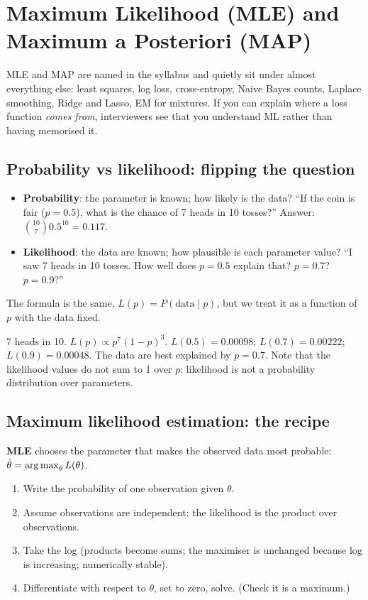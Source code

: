 \chapter{Maximum Likelihood (MLE) and Maximum a Posteriori (MAP)}

MLE and MAP are named in the syllabus and quietly sit under almost everything else: least squares, log loss, cross-entropy,
Naive Bayes counts, Laplace smoothing, Ridge and Lasso, EM for mixtures. If you can explain where a loss function
\emph{comes from}, interviewers see that you understand ML rather than having memorised it.

\section{Probability vs likelihood: flipping the question}
\begin{itemize}
\item \textbf{Probability}: the parameter is known; how likely is the data? ``If the coin is fair ($p = 0.5$), what is the chance of
  7 heads in 10 tosses?'' Answer: $\binom{10}{7}0.5^{10} = 0.117$.
\item \textbf{Likelihood}: the data are known; how plausible is each parameter value? ``I saw 7 heads in 10 tosses. How well does
  $p = 0.5$ explain that? $p = 0.7$? $p = 0.9$?''
\end{itemize}
The formula is the same, $L(p) = P(\text{data}\mid p)$, but we treat it as a function of $p$ with the data fixed.

\begin{example}
7 heads in 10. $L(p)\propto p^7(1-p)^3$. $L(0.5) = 0.00098$; $L(0.7) = 0.00222$; $L(0.9) = 0.00048$. The data are best explained
by $p = 0.7$. Note that the likelihood values do not sum to 1 over $p$: likelihood is not a probability distribution over parameters.
\end{example}

\section{Maximum likelihood estimation: the recipe}
\textbf{MLE} chooses the parameter that makes the observed data most probable: $\hat\theta = \operatorname*{arg\,max}_\theta L(\theta)$.
\begin{enumerate}
\item Write the probability of one observation given $\theta$.
\item Assume observations are independent: the likelihood is the product over observations.
\item Take the log (products become sums; the maximiser is unchanged because log is increasing; numerically stable).
\item Differentiate with respect to $\theta$, set to zero, solve. (Check it is a maximum.)
\end{enumerate}

